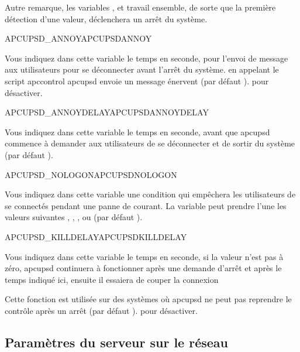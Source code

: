 \begin {description}
  Autre remarque, les variables , 
  et  travail ensemble, de sorte que la première détection
  d'une valeur, déclenchera un arrêt du système.


 {APCUPSD\_ANNOY}{APCUPSDANNOY}

  Vous indiquez dans cette variable le temps en seconde, pour l'envoi de message
  aux utilisateurs pour se déconnecter avant l'arrêt du système. en appelant le script
  apccontrol apcupsd envoie un message énervent (par défaut ).
   pour désactiver.


 {APCUPSD\_ANNOYDELAY}{APCUPSDANNOYDELAY}

  Vous indiquez dans cette variable le temps en seconde, avant que apcupsd
  commence à demander aux utilisateurs de se déconnecter et de sortir du système
  (par défaut ).


 {APCUPSD\_NOLOGON}{APCUPSDNOLOGON}

  Vous indiquez dans cette variable une condition qui empêchera les utilisateurs
  de se connectés pendant une panne de courant.
  La variable  peut prendre l'une les valeurs suivantes
  , , ,  ou
   (par défaut ).


 {APCUPSD\_KILLDELAY}{APCUPSDKILLDELAY}

  Vous indiquez dans cette variable le temps en seconde, si la valeur n'est pas
  à zéro, apcupsd continuera à fonctionner après une demande d'arrêt et après le
  temps indiqué ici, ensuite il essaiera de couper la connexion

  Cette fonction est utilisée sur des systèmes où apcupsd ne peut pas reprendre
  le contrôle après un arrêt (par défaut ).
   pour désactiver.

\end {description}

\subsection{Paramètres du serveur sur le réseau}

